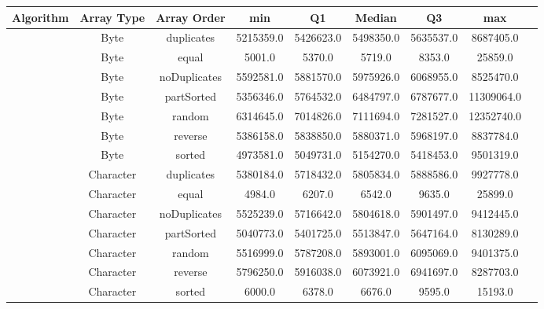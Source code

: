 \documentclass{article}
\begin{document}
\begin{table}[H]
    \centering
    \label{tab:untilnochange_metrics}
    \begin{tabular}{|c|c|c|c|c|c|c|c|c|}
        \toprule
        \textbf{Algorithm} & \textbf{Array Type} & \textbf{Array Order} & \textbf{min} & \textbf{Q1} & \textbf{Median} & \textbf{Q3} & \textbf{max} \\
        \midrule
        & Byte & duplicates & 5215359.0 & 5426623.0 & 5498350.0 & 5635537.0 & 8687405.0 \\
        & Byte & equal & 5001.0 & 5370.0 & 5719.0 & 8353.0 & 25859.0 \\
        & Byte & noDuplicates & 5592581.0 & 5881570.0 & 5975926.0 & 6068955.0 & 8525470.0 \\
        & Byte & partSorted & 5356346.0 & 5764532.0 & 6484797.0 & 6787677.0 & 11309064.0 \\
        & Byte & random & 6314645.0 & 7014826.0 & 7111694.0 & 7281527.0 & 12352740.0 \\
        & Byte & reverse & 5386158.0 & 5838850.0 & 5880371.0 & 5968197.0 & 8837784.0 \\
        & Byte & sorted & 4973581.0 & 5049731.0 & 5154270.0 & 5418453.0 & 9501319.0 \\
        
        & Character & duplicates & 5380184.0 & 5718432.0 & 5805834.0 & 5888586.0 & 9927778.0 \\
        & Character & equal & 4984.0 & 6207.0 & 6542.0 & 9635.0 & 25899.0 \\
        & Character & noDuplicates & 5525239.0 & 5716642.0 & 5804618.0 & 5901497.0 & 9412445.0 \\
        & Character & partSorted & 5040773.0 & 5401725.0 & 5513847.0 & 5647164.0 & 8130289.0 \\
        & Character & random & 5516999.0 & 5787208.0 & 5893001.0 & 6095069.0 & 9401375.0 \\
        & Character & reverse & 5796250.0 & 5916038.0 & 6073921.0 & 6941697.0 & 8287703.0 \\
        & Character & sorted & 6000.0 & 6378.0 & 6676.0 & 9595.0 & 15193.0 \\
        

\end{tabular}
\end{table}
\end{document}
